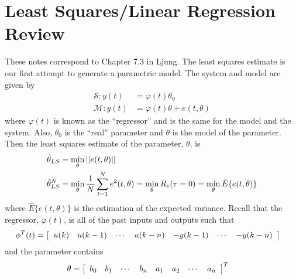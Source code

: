 
\mainmatter
\setcounter{page}{1}

\lectureseries[\course]{\course}

\date{October 20, 2009}

\setaddress

\setcounter{lecture}{7}
\setcounter{chapter}{7}


\section{Least Squares/Linear Regression Review}
These notes correspond to Chapter 7.3 in Ljung. The least squares estimate is our first attempt to generate a parametric model. The system and model are given by
\begin{align*}
\mathcal{S}: y(t) &= \varphi(t)\theta_0 \\
\mathcal{M}: y(t) &= \varphi(t)\theta + e(t,\theta)
\end{align*}
where $\varphi(t)$ is known as the ``regressor'' and is the same for the model and the system. Also, $\theta_0$ is the ``real'' parameter and $\theta$ is the model of the parameter. Then the least squares estimate of the parameter, $\theta$, is
\begin{align*}
\hat{\theta}_{LS} &= \min_\theta ||e(t,\theta)|| \\
\hat{\theta}_{LS}^N &= \min_\theta \frac{1}{N}\sum_{t=1}^Ne^2(t,\theta) = \min_\theta R_e(\tau=0) = \min_\theta\hat{E}\{e(t,\theta)\}
\end{align*}
where $\hat{E}\{e(t,\theta)\}$ is the estimation of the expected variance. Recall that the regressor, $\varphi(t)$, is all of the past inputs and outputs such that
\begin{align}
\label{eq:regressor}
\phi^T(t) &= \left[\begin{array}{c c c c c c c}
u(k) & u(k-1) & \cdots & u(k-n) & -y(k-1) & \cdots & -y(k-n) \end{array}\right]
\end{align}
and the parameter contains
\begin{align}
\label{eq:parameter}
\theta &= \left[\begin{array}{c c c c c c c c}
b_0 & b_1 & \cdots & b_n & a_1 & a_2 & \cdots & a_n \end{array}\right]^T
\end{align}
